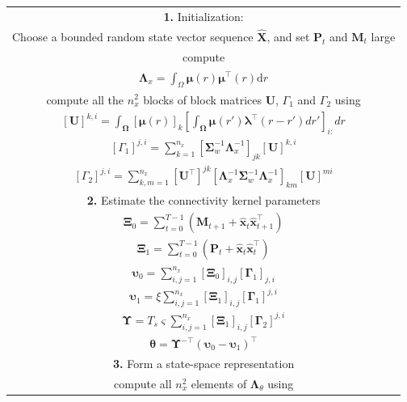\documentclass[review,authoryear,3p]{elsarticle}
\begin{document}
\begin{table}[!ht]
\begin{tabular}{|c|}\hline
\multicolumn{1}{|p{16cm}|}{\textbf{1.} Initialization:  } \\ 
\multicolumn{1}{|p{16cm}|}{Choose a bounded random state vector sequence $\hat{\mathbf X}$, and set $\mathbf P_t$ and $\mathbf M_t$ large} \\
\multicolumn{1}{|p{16cm}|}{compute} \\
$\mathbf{\Lambda}_{x}=\int_{\Omega}\boldsymbol{\mu}\left(r\right)\boldsymbol{\mu}^\top\left(r\right) \mathrm{d}r$\\
\multicolumn{1}{|p{16cm}|}{compute all the $n^2_x$ blocks of block matrices $\mathbf U$, $\Gamma_1$ and  $\Gamma_2$ using} \\
$\left[ \mathbf U\right] ^{k,i}=\int_{\boldsymbol \Omega}\left[\boldsymbol\mu(r) \right]_k \left[\int_{\boldsymbol\Omega} \boldsymbol\mu\left(r'\right)\boldsymbol \lambda^\top \left(r-r'\right) dr'\right]_{i:} dr$\\
$\left[ \Gamma_1\right]^{j,i} =\sum_{k=1}^{n_x}\left[ \boldsymbol\Sigma_w^{-1}\boldsymbol\Lambda_x^{-1}\right]_{jk} \left[ \mathbf U\right]^{k,i}$\\
$\left[ \Gamma_2\right] ^{j,i}=\sum_{k,m=1}^{n_x}[\mathbf U^{\top}]^{jk} \left[\boldsymbol\Lambda_x^{-1}\boldsymbol\Sigma_w^{-1}\boldsymbol\Lambda_x^{-1} \right]_{km}[\mathbf U]^{mi}$\\
\hline
\multicolumn{1}{|p{16cm}|}{\textbf{2.} Estimate the connectivity kernel parameters} \\
$\boldsymbol\Xi_0=\sum_{t=0}^{T-1}\left(\mathbf M_{t+1}+\mathbf{\hat x}_t\mathbf{\hat x}_{t+1}^\top\right)$\\
$\boldsymbol\Xi_1=\sum_{t=0}^{T-1}\left(\mathbf P_t+\mathbf{\hat x}_t\mathbf{\hat x}_t^\top\right)$\\
$\boldsymbol\upsilon_0=\sum_{i,j=1}^{n_x}[\boldsymbol\Xi_0]_{i,j}[\boldsymbol\Gamma_1]_{j,i}$\\
$\boldsymbol\upsilon_1=\xi\sum_{i,j=1}^{n_x}[\boldsymbol\Xi_1]_{i,j}[\boldsymbol\Gamma_1]^{j,i}$\\
$\boldsymbol\Upsilon=T_s\varsigma\sum_{i,j=1}^{n_x}[\boldsymbol\Xi_1]_{i,j}[\boldsymbol\Gamma_2]^{j,i}$\\
$\boldsymbol \theta= \boldsymbol\Upsilon^{-\top}(\boldsymbol\upsilon_0-\boldsymbol\upsilon_1)^\top$\\
\hline
\multicolumn{1}{|p{16cm}|}{\textbf{3.} Form a state-space representation}\\
\multicolumn{1}{|p{16cm}|}{compute all $n_x^2$ elements of $\boldsymbol\Lambda_{\theta}$ using} \\

\end{tabular}
\end{table}
\end{document}
